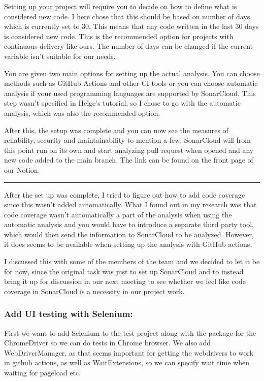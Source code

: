 Setting up your project will require you to decide on how to define what is considered new code. I here chose that this should be based on number of days, which is currently set to 30. This means that any code written in the last 30 days is considered new code. This is the recommended option for projects with continuous delivery like ours. The number of days can be changed if the current variable isn't suitable for our needs.

You are given two main options for setting up the actual analysis. You can choose methods such as GitHub Actions and other CI tools or you can choose automatic analysis if your used programming languages are supported by SonarCloud. This step wasn't specified in Helge's tutorial, so I chose to go with the automatic analysis, which was also the recommended option.

After this, the setup was complete and you can now see the measures of reliability, security and maintainability to mention a few. SonarCloud will from this point run on its own and start analyzing pull request when opened and any new code added to the main branch. The link can be found on the front page of our Notion.

\begin{center}\rule{0.5\linewidth}{0.5pt}\end{center}

After the set up was complete, I tried to figure out how to add code coverage since this wasn't added automatically. What I found out in my research was that code coverage wasn't automatically a part of the analysis when using the automatic analysis and you would have to introduce a separate third party tool, which would then send the information to SonarCloud to be analyzed. However, it does seems to be available when setting up the analysis with GitHub actions.

I discussed this with some of the members of the team and we decided to let it be for now, since the original task was just to set up SonarCloud and to instead bring it up for discussion in our next meeting to see whether we feel like code coverage in SonarCloud is a necessity in our project work.

\subsubsection{Add UI testing with Selenium:}
\label{log:add-ui-testing-with-selenium}
First we want to add Selenium to the test project along with the package for the ChromeDriver so we can do tests in Chrome browser. We also add WebDriverManager, as that seems important for getting the webdrivers to work in github actions, as well as WaitExtensions, so we can specify wait time when waiting for pageload etc.

